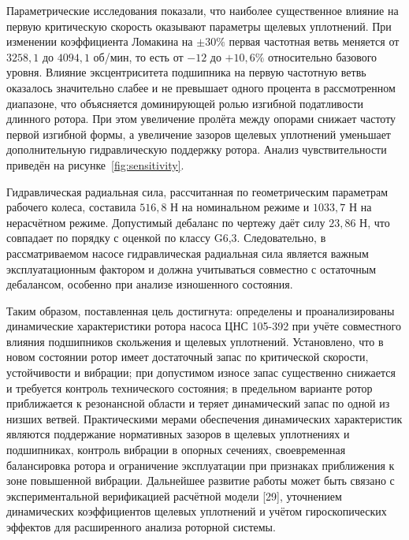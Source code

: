 Параметрические исследования показали, что наиболее существенное влияние на первую критическую скорость оказывают параметры щелевых уплотнений. При изменении коэффициента Ломакина на $\pm30\%$ первая частотная ветвь меняется от $3258{,}1$ до $4094{,}1$ об/мин, то есть от $-12$ до $+10{,}6\%$ относительно базового уровня. Влияние эксцентриситета подшипника на первую частотную ветвь оказалось значительно слабее и не превышает одного процента в рассмотренном диапазоне, что объясняется доминирующей ролью изгибной податливости длинного ротора. При этом увеличение пролёта между опорами снижает частоту первой изгибной формы, а увеличение зазоров щелевых уплотнений уменьшает дополнительную гидравлическую поддержку ротора. Анализ чувствительности приведён на рисунке~\ref{fig:sensitivity}.

Гидравлическая радиальная сила, рассчитанная по геометрическим параметрам рабочего колеса, составила $516{,}8$ Н на номинальном режиме и $1033{,}7$ Н на нерасчётном режиме. Допустимый дебаланс по чертежу даёт силу $23{,}86$ Н, что совпадает по порядку с оценкой по классу G6,3. Следовательно, в рассматриваемом насосе гидравлическая радиальная сила является важным эксплуатационным фактором и должна учитываться совместно с остаточным дебалансом, особенно при анализе изношенного состояния.

Таким образом, поставленная цель достигнута: определены и проанализированы динамические характеристики ротора насоса ЦНС 105-392 при учёте совместного влияния подшипников скольжения и щелевых уплотнений. Установлено, что в новом состоянии ротор имеет достаточный запас по критической скорости, устойчивости и вибрации; при допустимом износе запас существенно снижается и требуется контроль технического состояния; в предельном варианте ротор приближается к резонансной области и теряет динамический запас по одной из низших ветвей. Практическими мерами обеспечения динамических характеристик являются поддержание нормативных зазоров в щелевых уплотнениях и подшипниках, контроль вибрации в опорных сечениях, своевременная балансировка ротора и ограничение эксплуатации при признаках приближения к зоне повышенной вибрации. Дальнейшее развитие работы может быть связано с экспериментальной верификацией расчётной модели [29], уточнением динамических коэффициентов щелевых уплотнений и учётом гироскопических эффектов для расширенного анализа роторной системы.
